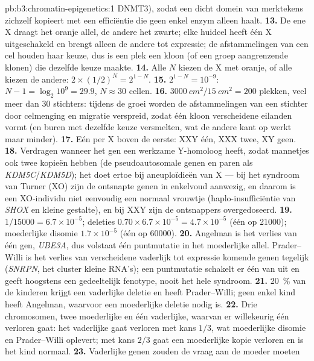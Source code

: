 \begin{solution}{pb:b3:chromatin-epigenetics:1}
DNMT3), zodat een dicht domein van merktekens zichzelf kopieert met
een efficiëntie die geen enkel enzym alleen haalt.
\textbf{13.} De ene X draagt het oranje allel, de andere het zwarte;
elke huidcel heeft één X uitgeschakeld en brengt alleen de andere tot
expressie; de afstammelingen van een cel houden haar keuze, dus is een
plek een kloon (of een groep aangrenzende klonen) die dezelfde keuze
maakte.
\textbf{14.} Alle $N$ kiezen de X met oranje, of alle kiezen de andere:
$2\times (1/2)^{N} = 2^{1-N}$.
\textbf{15.} $2^{1-N} = 10^{-9}$: $N - 1 = \log_{2} 10^{9} = 29.9$,
$N \approx 30$ cellen.
\textbf{16.} $\qty{3000}{cm^2}/\qty{15}{cm^2} = 200$ plekken, veel meer
dan $30$ stichters: tijdens de groei worden de afstammelingen van een
stichter door celmenging en migratie verspreid, zodat één kloon
verscheidene eilanden vormt (en buren met dezelfde keuze versmelten,
wat de andere kant op werkt maar minder).
\textbf{17.} Eén  per X boven de eerste: XXY één, XXX
twee, XY geen.
\textbf{18.} Verdragen wanneer het gen een werkzame Y-homoloog heeft,
zodat mannetjes ook twee kopieën hebben (de pseudoautosomale genen en
paren als \emph{KDM5C}/\emph{KDM5D}); het doet ertoe bij aneuploïdieën
van X --- bij het syndroom van Turner (XO) zijn de ontsnapte genen in
enkelvoud aanwezig, en daarom is een XO-individu niet eenvoudig een
normaal vrouwtje (haplo-insufficiëntie van \emph{SHOX} en kleine
gestalte), en bij XXY zijn de ontsnappers overgedoseerd.
\textbf{19.} $1/\num{15000} = 6.7\times 10^{-5}$; deleties $0.70\times
6.7\times 10^{-5} = 4.7\times 10^{-5}$ (één op \num{21000});
moederlijke disomie $1.7\times 10^{-5}$ (één op \num{60000}).
\textbf{20.} Angelman is het verlies van één gen, \emph{UBE3A}, dus
volstaat één puntmutatie in het moederlijke allel. Prader--Willi is het
verlies van verscheidene vaderlijk tot expressie komende genen tegelijk
(\emph{SNRPN}, het cluster kleine RNA's); een puntmutatie schakelt er
één van uit en geeft hoogstens een gedeeltelijk fenotype, nooit het
hele syndroom.
\textbf{21.} \qty{20}{\%} van de kinderen krijgt een vaderlijke deletie
en heeft Prader--Willi; geen enkel kind heeft Angelman, waarvoor een
moederlijke deletie nodig is.
\textbf{22.} Drie chromosomen, twee moederlijke en één vaderlijke,
waarvan er willekeurig één verloren gaat: het vaderlijke gaat verloren
met kans $1/3$, wat moederlijke disomie en Prader--Willi oplevert; met
kans $2/3$ gaat een moederlijke kopie verloren en is het kind normaal.
\textbf{23.} Vaderlijke genen zouden de vraag aan de moeder moeten

\end{solution}
